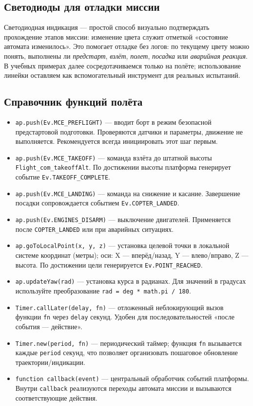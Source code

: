\subsection{Светодиоды для отладки миссии}
Светодиодная индикация — простой способ визуально подтверждать прохождение этапов миссии: изменение цвета служит отметкой «состояние автомата изменилось». Это помогает отладке без логов: по текущему цвету можно понять, выполнены ли \emph{предстарт}, \emph{взлёт}, \emph{полет}, \emph{посадка} или \emph{аварийная реакция}. В учебных примерах далее сосредотачиваемся только на полёте; использование линейки оставляем как вспомогательный инструмент для реальных испытаний.

\subsection{Справочник функций полёта}
 \begin{itemize}
   \item \texttt{ap.push(Ev.MCE\_PREFLIGHT)} — вводит борт в режим безопасной предстартовой подготовки. Проверяются датчики и параметры, движение не выполняется. Рекомендуется всегда инициировать этот шаг первым.
   \item \texttt{ap.push(Ev.MCE\_TAKEOFF)} — команда взлёта до штатной высоты \texttt{Flight\_com\_takeoffAlt}. По достижении высоты платформа генерирует событие \texttt{Ev.TAKEOFF\_COMPLETE}.
   \item \texttt{ap.push(Ev.MCE\_LANDING)} — команда на снижение и касание. Завершение посадки сопровождается событием \texttt{Ev.COPTER\_LANDED}.
   \item \texttt{ap.push(Ev.ENGINES\_DISARM)} — выключение двигателей. Применяется после \texttt{COPTER\_LANDED} или при аварийных ситуациях.
   \item \texttt{ap.goToLocalPoint(x, y, z)} — установка целевой точки в локальной системе координат (метры); оси: X — вперёд/назад, Y — влево/вправо, Z — высота. По достижении цели генерируется \texttt{Ev.POINT\_REACHED}.
   \item \texttt{ap.updateYaw(rad)} — установка курса в радианах. Для значений в градусах используйте преобразование \texttt{rad = deg * math.pi / 180}.
   \item \texttt{Timer.callLater(delay, fn)} — отложенный неблокирующий вызов функции \texttt{fn} через \texttt{delay} секунд. Удобен для последовательностей «после события — действие».
   \item \texttt{Timer.new(period, fn)} — периодический таймер; функция \texttt{fn} вызывается каждые \texttt{period} секунд, что позволяет организовать пошаговое обновление траектории/индикации.
   \item \texttt{function callback(event)} — центральный обработчик событий платформы. Внутри \texttt{callback} реализуются переходы автомата миссии и вызываются соответствующие действия.
 \end{itemize}


